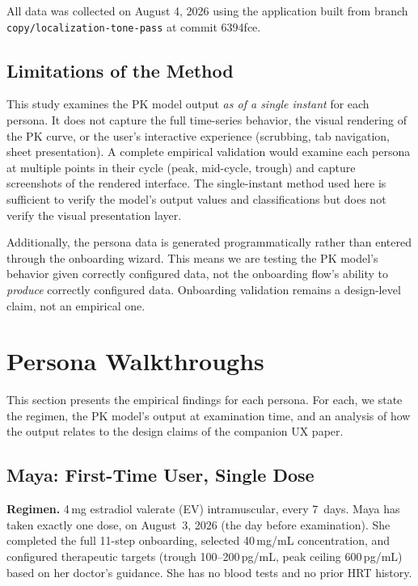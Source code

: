 \documentclass[11pt,a4paper]{article}
\newcommand{\code}[1]{\texttt{\small #1}}
\begin{document}
All data was collected on August 4, 2026 using the application built from
branch \code{copy/localization-tone-pass} at commit 6394fce.

\subsection{Limitations of the Method}

This study examines the PK model output \emph{as of a single instant} for
each persona. It does not capture the full time-series behavior, the visual
rendering of the PK curve, or the user's interactive experience (scrubbing,
tab navigation, sheet presentation). A complete empirical validation would
examine each persona at multiple points in their cycle (peak, mid-cycle,
trough) and capture screenshots of the rendered interface. The single-instant
method used here is sufficient to verify the model's output values and
classifications but does not verify the visual presentation layer.

Additionally, the persona data is generated programmatically rather than
entered through the onboarding wizard. This means we are testing the PK
model's behavior given correctly configured data, not the onboarding flow's
ability to \emph{produce} correctly configured data. Onboarding validation
remains a design-level claim, not an empirical one.

\section{Persona Walkthroughs}
\label{sec:personas}

This section presents the empirical findings for each persona. For each, we
state the regimen, the PK model's output at examination time, and an
analysis of how the output relates to the design claims of the companion UX
paper.

\subsection{Maya: First-Time User, Single Dose}
\label{sec:maya}

\textbf{Regimen.} 4\,mg estradiol valerate (EV) intramuscular, every
7~days. Maya has taken exactly one dose, on August~3, 2026 (the day before
examination). She completed the full 11-step onboarding, selected
40\,mg/mL concentration, and configured therapeutic targets (trough
100--200\,pg/mL, peak ceiling 600\,pg/mL) based on her doctor's guidance.
She has no blood tests and no prior HRT history.
\end{document}
